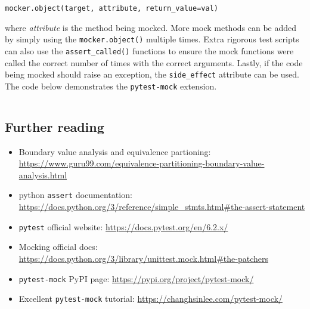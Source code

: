 \documentclass[11pt]{article}
\begin{document}
\vspace{\baselineskip}
\noindent
\texttt{mocker.object(target, attribute, return_value=val)}
\vspace{\baselineskip}

\noindent
where \textit{attribute} is the method being mocked. More mock methods can be added by simply using the \texttt{mocker.object()} multiple times. Extra rigorous test scripts can also use the \texttt{assert_called()} functions to ensure the mock functions were called the correct number of times with the correct arguments. Lastly, if the code being mocked should raise an exception, the \texttt{side_effect} attribute can be used. The code below demonstrates the \texttt{pytest-mock} extension.

\inputminted[]{python}{python_examples/pytest-mock_example.py}

\subsection{Further reading}

\begin{itemize}
    \item Boundary value analysis and equivalence partioning: \url{https://www.guru99.com/equivalence-partitioning-boundary-value-analysis.html}
    \item \Gls{python} \texttt{assert} documentation: \url{https://docs.python.org/3/reference/simple_stmts.html#the-assert-statement}
    \item \texttt{pytest} official website: \url{https://docs.pytest.org/en/6.2.x/}
    \item Mocking official docs: \url{https://docs.python.org/3/library/unittest.mock.html#the-patchers}
    \item \texttt{pytest-mock} PyPI page: \url{https://pypi.org/project/pytest-mock/}
    \item Excellent \texttt{pytest-mock} tutorial: \url{https://changhsinlee.com/pytest-mock/}
\end{itemize}

\newpage

\printbibliography[heading=bibintoc]
\end{document}
